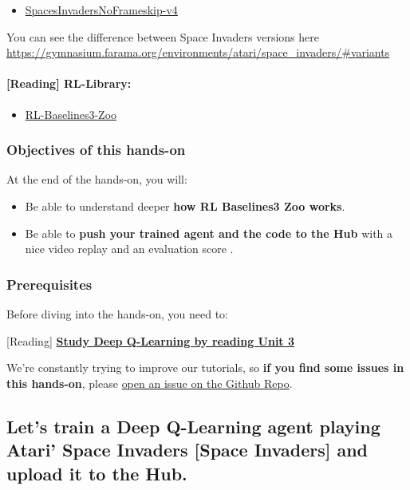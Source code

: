 \documentclass[11pt,a4paper]{article}
\begin{document}
\begin{itemize}
\tightlist
\item
  \href{https://gymnasium.farama.org/environments/atari/space_invaders/}{SpacesInvadersNoFrameskip-v4}
\end{itemize}

You can see the difference between Space Invaders versions here \url{https://gymnasium.farama.org/environments/atari/space_invaders/#variants}

\paragraph{{[}Reading{]} RL-Library:}\label{reading-rl-library}

\begin{itemize}
\tightlist
\item
  \href{https://github.com/DLR-RM/rl-baselines3-zoo}{RL-Baselines3-Zoo}
\end{itemize}

\subsubsection{Objectives of this hands-on}\label{objectives-of-this-hands-on}

At the end of the hands-on, you will:

\begin{itemize}
\tightlist
\item
  Be able to understand deeper \textbf{how RL Baselines3 Zoo works}.
\item
  Be able to \textbf{push your trained agent and the code to the Hub} with a nice video replay and an evaluation score .
\end{itemize}

\subsubsection{Prerequisites}\label{prerequisites}

Before diving into the hands-on, you need to:

{[}Reading{]} \textbf{\href{https://huggingface.co/deep-rl-course/unit3/introduction}{Study Deep Q-Learning by reading Unit 3}}

We're constantly trying to improve our tutorials, so \textbf{if you find some issues in this hands-on}, please \href{https://github.com/huggingface/deep-rl-class/issues}{open an issue on the Github Repo}.

\subsection{Let's train a Deep Q-Learning agent playing Atari' Space Invaders {[}Space Invaders{]} and upload it to the Hub.}\label{lets-train-a-deep-q-learning-agent-playing-atari-space-invaders-space-invaders-and-upload-it-to-the-hub.}
\end{document}
